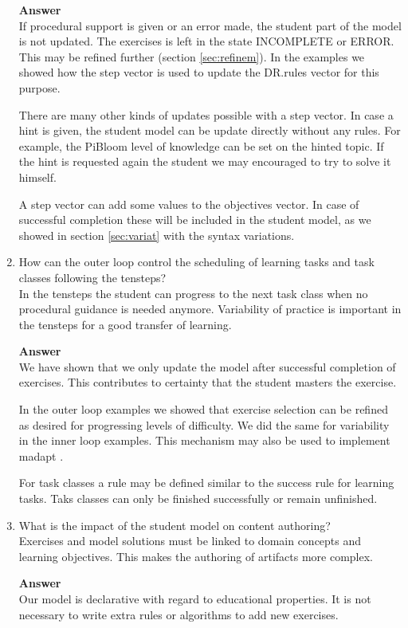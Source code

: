\begin{enumerate}[Q1.]
\textbf{Answer}\\
If procedural support is given or an error made, the student part of the model is not updated.
The exercises is left in the state INCOMPLETE or ERROR.
This may be refined further (section \ref{sec:refinem}).
In the examples we showed how the step vector is used to update the DR.rules vector for this purpose.

There are many other kinds of updates possible with a step vector.
In case a hint is given, the student model can be update directly without any rules.
For example, the PiBloom level of knowledge can be set on the hinted topic.
If the hint is requested again the student we may encouraged to try to solve it himself.


A step vector can add some values to  the objectives vector. 
In case of successful completion these will be included in the student model, as we showed in section \ref{sec:variat} with the syntax variations.


\item How can the outer loop control the scheduling of learning tasks and task classes following the \gls{tensteps}?\\
In the \gls{tensteps} the student can progress to the next task class when no procedural guidance is needed anymore.
Variability of practice is important in the \gls{tensteps}  for a good transfer of learning.

\textbf{Answer}\\
We have shown that we only update the model after successful completion of exercises.
This contributes to certainty that the student masters the exercise.

In the outer loop examples we showed that exercise selection can be refined as desired for progressing levels of difficulty.
We did the same for variability in the inner loop examples.
This mechanism may also be used to implement \gls{madapt} \citep{vanlehn2006}.

For task classes a rule may be defined similar to the success rule for learning tasks.
Taks classes can only be finished successfully or remain unfinished.

\item What is the impact of the student model on content authoring?\\
Exercises and model solutions must be linked to domain concepts and learning objectives.
This makes the authoring of artifacts more complex. 

\textbf{Answer}\\
Our model is declarative with regard to educational properties. 
It is not necessary to write extra rules or algorithms to add new exercises.


\end{enumerate}
